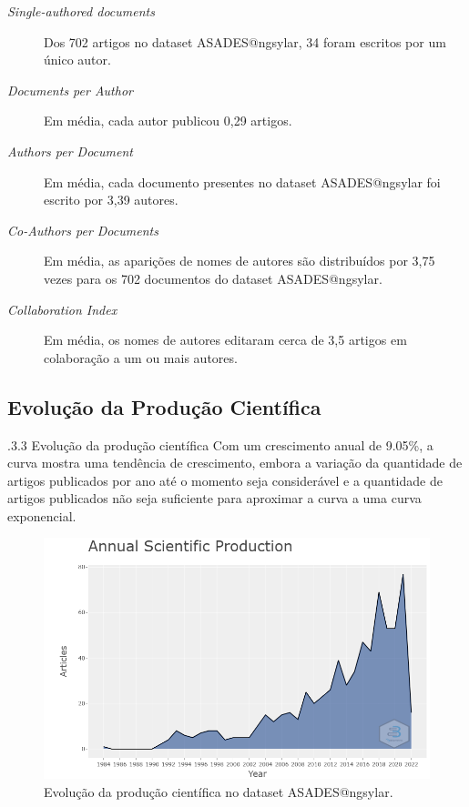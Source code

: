 \begin{description}
\item [\textit{Single-authored documents}] Dos 702 artigos no dataset ASADES@ngsylar, 34 foram escritos por um único autor.

\item [\textit{Documents per Author}] Em média, cada autor publicou 0,29 artigos.

\item [\textit{Authors per Document}] Em média, cada documento presentes no dataset ASADES@ngsylar foi escrito por 3,39 autores.

\item [\textit{Co-Authors per Documents}] Em média, as aparições de nomes de autores são distribuídos por 3,75 vezes para os 702 documentos do dataset ASADES@ngsylar.

\item [\textit{Collaboration Index}] Em média, os nomes de autores editaram cerca de 3,5 artigos em colaboração a um ou mais autores.
\end{description}

\subsection{Evolução da Produção Científica}

.3.3 Evolução da produção científica
Com um crescimento anual de 9.05\%, a curva mostra uma tendência de crescimento, embora a variação da quantidade de artigos publicados por ano até o momento seja considerável e a quantidade de artigos publicados não seja suficiente para aproximar a curva a uma curva exponencial.

\begin{figure}[H]
    \centering
    \includegraphics[width=1\textwidth]{experiments/ngsylar/PesqBibliogr/Imagens/ASADES-AnnualScientificProduction.png}
    \caption{Evolução da produção científica no dataset ASADES@ngsylar.}
    \label{fig:evol:anual:ASADES@ngsylar}
\end{figure}

